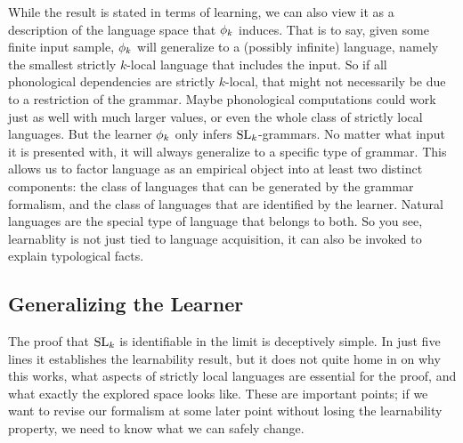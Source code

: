 While the result is stated in terms of learning, we can also view it as a description of the language space that $\phi_k$ induces.
That is to say, given some finite input sample, $\phi_k$ will generalize to a (possibly infinite) language, namely the smallest strictly $k$-local language that includes the input.
So if all phonological dependencies are strictly $k$-local, that might not necessarily be due to a restriction of the grammar.
Maybe phonological computations could work just as well with much larger values, or even the whole class of strictly local languages.
But the learner $\phi_k$ only infers $\mathrm{SL}_k$-grammars.
No matter what input it is presented with, it will always generalize to a specific type of grammar.
This allows us to factor language as an empirical object into at least two distinct components: the class of languages that can be generated by the grammar formalism, and the class of languages that are identified by the learner.
Natural languages are the special type of language that belongs to both.
So you see, learnablity is not just tied to language acquisition, it can also be invoked to explain typological facts.


\subsection{Generalizing the Learner}
The proof that $\mathrm{SL}_k$ is identifiable in the limit is deceptively simple.
In just five lines it establishes the learnability result, but it does not quite home in on why this works, what aspects of strictly local languages are essential for the proof, and what exactly the explored space looks like.
These are important points; if we want to revise our formalism at some later point without losing the learnability property, we need to know what we can safely change.

